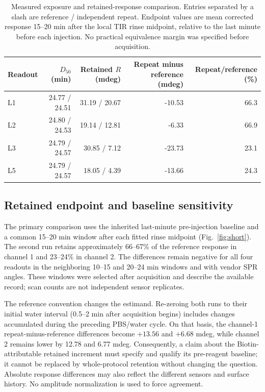 \documentclass[lettersize,journal]{IEEEtran}
\begin{document}
\begin{table}[t]\centering\small
\caption{Measured exposure and retained-response comparison. Entries
separated by a slash are reference / independent repeat. Endpoint values
are mean corrected response 15--20 min after the local TIR rinse midpoint,
relative to the last minute before each injection. No practical
equivalence margin was specified before acquisition.}
\label{tab:short}
\begin{tabular}{lrrrr}\toprule
Readout & $D_{50}$ (min) & Retained $R$ (mdeg) & Repeat minus reference (mdeg) & Repeat/reference (\%)\\\midrule
L1 & 24.77 / 24.51 & 31.19 / 20.67 & -10.53 & 66.3\\
L2 & 24.80 / 24.53 & 19.14 / 12.81 & -6.33 & 66.9\\
L3 & 24.79 / 24.57 & 30.85 / 7.12 & -23.73 & 23.1\\
L5 & 24.79 / 24.57 & 18.05 / 4.39 & -13.66 & 24.3\\
\bottomrule\end{tabular}
\end{table}

\subsection{Retained endpoint and baseline sensitivity}
The primary comparison uses the inherited last-minute pre-injection
baseline and a common 15--20 min window after each fitted rinse midpoint
(Fig.~\ref{fig:short}). The second run retains approximately 66--67\% of
the reference response in channel 1 and 23--24\% in channel 2. The
differences remain negative for all four readouts in the neighboring
10--15 and 20--24 min windows and with vendor SPR angles. These windows
were selected after acquisition and describe the available record; scan
counts are not independent sensor replicates.

The reference convention changes the estimand. Re-zeroing both runs to
their initial water interval (0.5--2 min after acquisition begins) includes
changes accumulated during the preceding PBS/water cycle. On that basis,
the channel-1 repeat-minus-reference differences become $+13.56$ and
$+6.68$ mdeg, while channel 2 remains lower by 12.78 and 6.77 mdeg.
Consequently, a claim about the Biotin-attributable retained increment
must specify and qualify its pre-reagent baseline; it cannot be replaced
by whole-protocol retention without changing the question. Absolute
response differences may also reflect the different sensors and surface
history. No amplitude normalization is used to force agreement.
\end{document}
